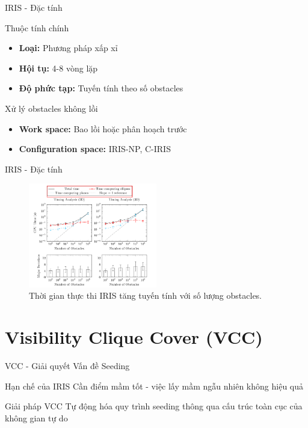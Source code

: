 \documentclass[aspectratio=169]{beamer}
\begin{document}
\begin{frame}{IRIS - Đặc tính}

    \begin{block}{Thuộc tính chính}
        \begin{itemize}
            \item \textbf{Loại:} Phương pháp xấp xỉ
            \item \textbf{Hội tụ:} 4-8 vòng lặp
            \item \textbf{Độ phức tạp:} Tuyến tính theo số obstacles
        \end{itemize}
    \end{block}

    \begin{alertblock}{Xử lý obstacles không lồi}
        \begin{itemize}
            \item \textbf{Work space:} Bao lồi hoặc phân hoạch trước
            \item \textbf{Configuration space:} IRIS-NP, C-IRIS
        \end{itemize}
    \end{alertblock}

\end{frame}

\begin{frame}{IRIS - Đặc tính}
    \begin{figure}
        \centering
        \includegraphics[width=0.5\textwidth]{imgs/time-iris.png}
        \caption{\small Thời gian thực thi IRIS tăng tuyến tính với số lượng obstacles.}
    \end{figure}
\end{frame}

\section{Visibility Clique Cover (VCC)}

\begin{frame}{VCC - Giải quyết Vấn đề Seeding}

    \begin{alertblock}{Hạn chế của IRIS}
        Cần điểm mầm tốt - việc lấy mầm ngẫu nhiên không hiệu quả
    \end{alertblock}

    \begin{exampleblock}{Giải pháp VCC}
        Tự động hóa quy trình seeding thông qua cấu trúc toàn cục của không gian tự do
    \end{exampleblock}

\end{frame}
\end{document}
